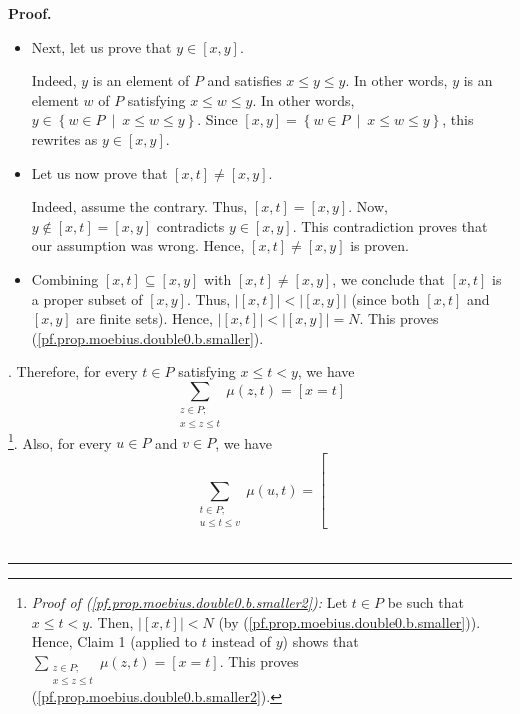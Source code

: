 \documentclass[numbers=enddot,12pt,final,onecolumn,notitlepage]{scrartcl}%
\theoremstyle{definition}
\newenvironment{proof}[1][Proof]{\noindent\textbf{#1.} }{\ \rule{0.5em}{0.5em}}
\newenvironment{verlong}{}{}
\let\sumnonlimits\sum
\renewcommand{\sum}{\sumnonlimits\limits}
\begin{document}
\begin{verlong}
\begin{proof}
{\begin{itemize}
\item Next, let us prove that $y\in\left[  x,y\right]  $.
\par
Indeed, $y$ is an element of $P$ and satisfies $x\leq y\leq y$. In other
words, $y$ is an element $w$ of $P$ satisfying $x\leq w\leq y$. In other
words, $y\in\left\{  w\in P\ \mid\ x\leq w\leq y\right\}  $. Since $\left[
x,y\right]  =\left\{  w\in P\ \mid\ x\leq w\leq y\right\}  $, this rewrites as
$y\in\left[  x,y\right]  $.
\par
\item Let us now prove that $\left[  x,t\right]  \neq\left[  x,y\right]  $.
\par
Indeed, assume the contrary. Thus, $\left[  x,t\right]  =\left[  x,y\right]
$. Now, $y\notin\left[  x,t\right]  =\left[  x,y\right]  $ contradicts
$y\in\left[  x,y\right]  $. This contradiction proves that our assumption was
wrong. Hence, $\left[  x,t\right]  \neq\left[  x,y\right]  $ is proven.
\par
\item Combining $\left[  x,t\right]  \subseteq\left[  x,y\right]  $ with
$\left[  x,t\right]  \neq\left[  x,y\right]  $, we conclude that $\left[
x,t\right]  $ is a proper subset of $\left[  x,y\right]  $. Thus, $\left\vert
\left[  x,t\right]  \right\vert <\left\vert \left[  x,y\right]  \right\vert $
(since both $\left[  x,t\right]  $ and $\left[  x,y\right]  $ are finite
sets). Hence, $\left\vert \left[  x,t\right]  \right\vert <\left\vert \left[
x,y\right]  \right\vert =N$. This proves
(\ref{pf.prop.moebius.double0.b.smaller}).
\end{itemize}
}. Therefore, for every $t\in P$ satisfying $x\leq t<y$, we have%
\begin{equation}
\sum_{\substack{z\in P;\\x\leq z\leq t}}\mu\left(  z,t\right)  =\left[
x=t\right]  \label{pf.prop.moebius.double0.b.smaller2}%
\end{equation}
\footnote{\textit{Proof of (\ref{pf.prop.moebius.double0.b.smaller2}):} Let
$t\in P$ be such that $x\leq t<y$. Then, $\left\vert \left[  x,t\right]
\right\vert <N$ (by (\ref{pf.prop.moebius.double0.b.smaller})). Hence, Claim 1
(applied to $t$ instead of $y$) shows that $\sum_{\substack{z\in P;\\x\leq
z\leq t}}\mu\left(  z,t\right)  =\left[  x=t\right]  $. This proves
(\ref{pf.prop.moebius.double0.b.smaller2}).}. Also, for every $u\in P$ and
$v\in P$, we have%
\begin{equation}
\sum_{\substack{t\in P;\\u\leq t\leq v}}\mu\left(  u,t\right)  =\left[

\end{equation}
\end{proof}
\end{verlong}
\end{document}
